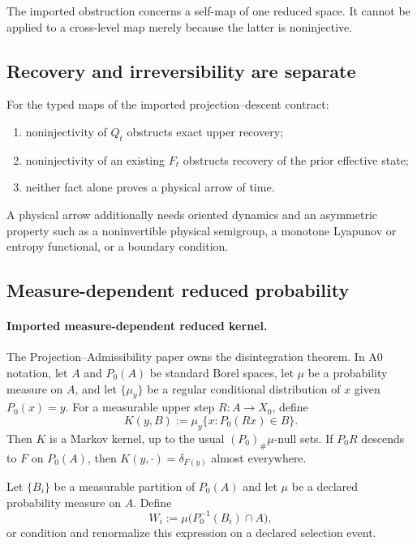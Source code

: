 \documentclass[11pt]{article}
\theoremstyle{plain}
\theoremstyle{plain}
\begin{document}
\begin{remark}
The imported obstruction concerns a self-map of one reduced
space.  It cannot be applied to a cross-level map merely because the latter
is noninjective.
\end{remark}

\subsection{Recovery and irreversibility are separate}

\begin{proposition}
For the typed maps of the imported projection--descent contract:
\begin{enumerate}
\item noninjectivity of $Q_t$ obstructs exact upper recovery;
\item noninjectivity of an existing $F_t$ obstructs recovery of the prior
effective state;
\item neither fact alone proves a physical arrow of time.
\end{enumerate}
A physical arrow additionally needs oriented dynamics and an asymmetric
property such as a noninvertible physical semigroup, a monotone Lyapunov or
entropy functional, or a boundary condition.
\end{proposition}

\subsection{Measure-dependent reduced probability}

\paragraph{Imported measure-dependent reduced kernel.}
The Projection--Admissibility paper owns the disintegration theorem.  In A0
notation, let $A$ and $P_0(A)$ be standard Borel spaces, let $\mu$ be a
probability measure on $A$, and let $\{\mu_y\}$ be a regular conditional
distribution of $x$ given $P_0(x)=y$.  For a measurable upper step
$R:A\to X_0$, define
\[
K(y,B):=\mu_y\{x:P_0(Rx)\in B\}.
\]
Then $K$ is a Markov kernel, up to the usual $(P_0)_\#\mu$-null sets.  If
$P_0R$ descends to $F$ on $P_0(A)$, then
$K(y,\cdot)=\delta_{F(y)}$ almost everywhere.

\begin{definition}
Let $\{B_i\}$ be a measurable partition of $P_0(A)$ and let $\mu$ be a
declared probability measure on $A$.  Define
\[
W_i :=
\mu\big(P_0^{-1}(B_i)\cap A\big),
\]
or condition and renormalize this expression on a declared selection event.
\end{definition}
\end{document}
